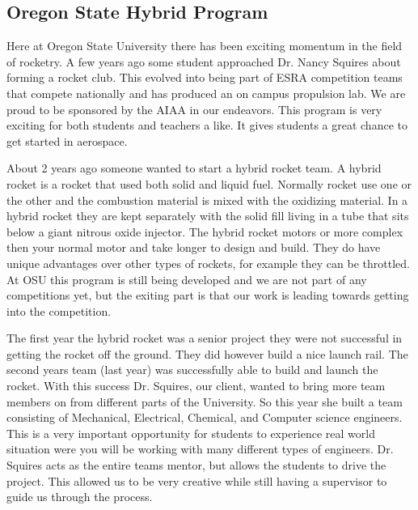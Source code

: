 \documentclass[10pt,draftclsnofoot,onecolumn,retainorgcmds]{IEEEtran}
\begin{document}
\subsection{Oregon State Hybrid Program}
Here at Oregon State University there has been exciting momentum in the field of rocketry. A few years ago some student approached Dr. Nancy Squires about forming a rocket club. This evolved into being part of ESRA competition teams that compete nationally and has produced an on campus propulsion lab. We are proud to be sponsored by the AIAA in our endeavors. This program is very exciting for both students and teachers a like. It gives students a great chance to get started in aerospace. \par
About 2 years ago someone wanted to start a hybrid rocket team. A hybrid rocket is a rocket that used both solid and liquid fuel. Normally rocket use one or the other and the combustion material is mixed with the oxidizing material. In a hybrid rocket they are kept separately with the solid fill living in a tube that sits below a giant nitrous oxide injector. The hybrid rocket motors or more complex then your normal motor and take longer to design and build. They do have unique advantages over other types of rockets, for example they can be throttled. At OSU this program is still being developed and we are not part of any competitions yet, but the exiting part is that our work is leading towards getting into the competition. \par
The first year the hybrid rocket was a senior project they were not successful in getting the rocket off the ground. They did however build a nice launch rail. The second years team (last year) was successfully able to build and launch the rocket. With this success Dr. Squires, our client, wanted to bring more team members on from different parts of the University. So this year she built a team consisting of Mechanical, Electrical, Chemical, and Computer science engineers. This is a very important opportunity for students to experience real world situation were you will be working with many different types of engineers. Dr. Squires acts as the entire teams mentor, but allows the students to drive the project. This allowed us to be very creative while still having a supervisor to guide us through the process. \par
\end{document}
